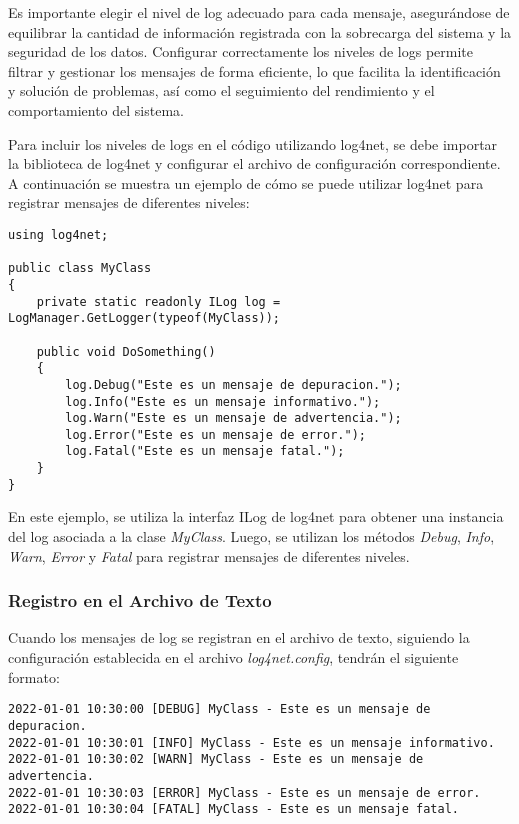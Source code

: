 \documentclass[executivepaper]{article}
\begin{document}
Es importante elegir el nivel de log adecuado para cada mensaje, asegurándose de equilibrar la cantidad de información registrada con la sobrecarga del sistema y la seguridad de los datos. Configurar correctamente los niveles de logs permite filtrar y gestionar los mensajes de forma eficiente, lo que facilita la identificación y solución de problemas, así como el seguimiento del rendimiento y el comportamiento del sistema.

Para incluir los niveles de logs en el código utilizando log4net, se debe importar la biblioteca de log4net y configurar el archivo de configuración correspondiente. A continuación se muestra un ejemplo de cómo se puede utilizar log4net para registrar mensajes de diferentes niveles:

\begin{lstlisting}
using log4net;

public class MyClass
{
    private static readonly ILog log = LogManager.GetLogger(typeof(MyClass));

    public void DoSomething()
    {
        log.Debug("Este es un mensaje de depuracion.");
        log.Info("Este es un mensaje informativo.");
        log.Warn("Este es un mensaje de advertencia.");
        log.Error("Este es un mensaje de error.");
        log.Fatal("Este es un mensaje fatal.");
    }
}
\end{lstlisting}

En este ejemplo, se utiliza la interfaz ILog de log4net para obtener una instancia del log asociada a la clase \emph{MyClass}. Luego, se utilizan los métodos \emph{Debug}, \emph{Info}, \emph{Warn}, \emph{Error} y \emph{Fatal} para registrar mensajes de diferentes niveles.

\subsubsection*{Registro en el Archivo de Texto}

Cuando los mensajes de log se registran en el archivo de texto, siguiendo la configuración establecida en el archivo \emph{log4net.config}, tendrán el siguiente formato:

\begin{verbatim}
2022-01-01 10:30:00 [DEBUG] MyClass - Este es un mensaje de depuracion.
2022-01-01 10:30:01 [INFO] MyClass - Este es un mensaje informativo.
2022-01-01 10:30:02 [WARN] MyClass - Este es un mensaje de advertencia.
2022-01-01 10:30:03 [ERROR] MyClass - Este es un mensaje de error.
2022-01-01 10:30:04 [FATAL] MyClass - Este es un mensaje fatal.
\end{verbatim}
\end{document}
